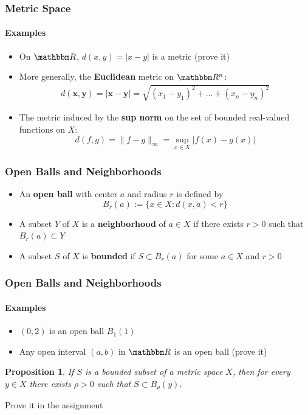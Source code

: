 \documentclass[9pt,aspectratio=169]{beamer}
\newcommand{\RR}{\mathbbm R}
\newtheorem{proposition}[theorem]{Proposition}
\begin{document}
\begin{frame}
    \frametitle{Metric Space}
    \framesubtitle{Examples}
    \begin{itemize}
        \item On $\RR$, $d(x, y) = |x - y|$ is a metric (prove it)
        \item More generally, the \textbf{Euclidean} metric on $\RR^n$:
        \begin{eqnarray*}
            d(\bm{x}, \bm{y}) = |\bm{x} - \bm{y}| = \sqrt{(x_1 - y_1)^2 +
                \ldots + (x_n - y_n)^2}
        \end{eqnarray*}
        \item The metric induced by the \textbf{sup norm} on the set of bounded
        real-valued functions on $X$:
        \begin{equation*}
            d(f, g) = \|f - g\|_\infty = \sup_{x \in X}|f(x) - g(x)|
        \end{equation*}
    \end{itemize}
\end{frame}

\begin{frame}
    \frametitle{Open Balls and Neighborhoods}
    \begin{definition}
        \begin{itemize}
            \item An \textbf{open ball} with center $a$ and radius $r$ is
            defined by
            \begin{equation*}
                B_r(a) := \{x\in X: d(x, a) < r \}
            \end{equation*}
            \item A subset $Y$ of $X$ is a \textbf{neighborhood} of $a \in X$
            if there exists $r > 0$ such that $B_r(a) \subset Y$
            \item A subset $S$ of $X$ is \textbf{bounded} if $S \subset
            B_r(a)$ for some $a\in X$ and $r > 0$
        \end{itemize}
    \end{definition}
\end{frame}

\begin{frame}
    \frametitle{Open Balls and Neighborhoods}
    \framesubtitle{Examples}
    \begin{itemize}
        \item $(0, 2)$ is an open ball $B_1(1)$
        \item Any open interval $(a, b)$ in $\RR$ is an open ball (prove it)
    \end{itemize}
    \begin{proposition}
        If $S$ is a bounded subset of a metric space $X$, then for every $y
        \in X$ there exists $\rho > 0$ such that $S \subset B_\rho(y)$.
    \end{proposition}
    Prove it in the assignment
\end{frame}
\end{document}
